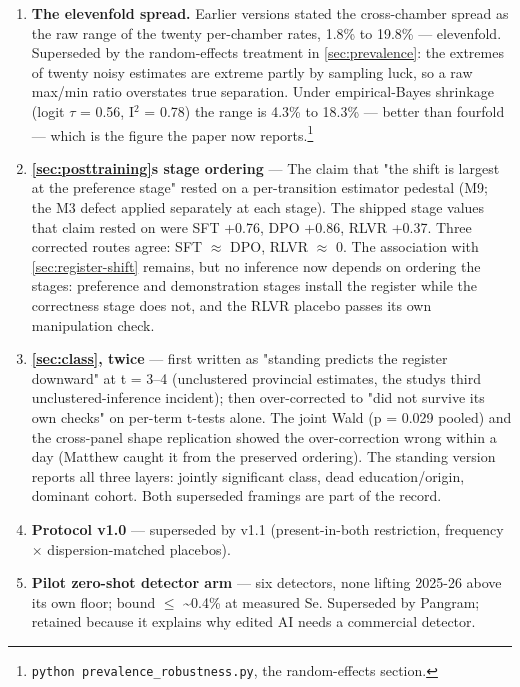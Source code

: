 \begin{enumerate}
\def\labelenumi{\arabic{enumi}.}
\item
  \textbf{The elevenfold spread.} Earlier versions stated the cross-chamber
  spread as the raw range of the twenty per-chamber rates, 1.8\% to 19.8\% ---
  elevenfold. Superseded by the random-effects treatment in \cref{sec:prevalence}: the
  extremes of twenty noisy estimates are extreme partly by sampling luck, so
  a raw max/min ratio overstates true separation. Under empirical-Bayes
  shrinkage (logit \(\tau\) = 0.56, I\({}^{2}\) = 0.78) the range is 4.3\% to 18.3\% ---
  better than fourfold --- which is the figure the paper now
  reports.\footnote{\texttt{python\ prevalence\_\allowbreak{}robustness.\allowbreak{}py}, the random-effects section.}
\item
  \textbf{\cref{sec:posttraining}\textquotesingle s stage ordering} --- The claim that "the shift is largest at the
  preference stage" rested on a per-transition estimator pedestal (M9; the
  M3 defect applied separately at each stage). The shipped stage values that
  claim rested on were SFT +0.76, DPO +0.86, RLVR +0.37. Three corrected
  routes agree:
  SFT \(\approx\) DPO, RLVR \(\approx\) 0. The association with \cref{sec:register-shift} remains, but no inference
  now depends on ordering the stages: preference and demonstration stages
  install the register while the correctness stage does not, and the RLVR
  placebo passes its own manipulation check.
\item
  \textbf{\cref{sec:class}, twice} --- first written as "standing predicts the register
  downward" at t = 3--4 (unclustered provincial estimates, the study\textquotesingle s third
  unclustered-inference incident); then over-corrected to "did not survive
  its own checks" on per-term t-tests alone. The joint Wald (p = 0.029
  pooled) and the cross-panel shape replication showed the over-correction
  wrong within a day (Matthew caught it from the preserved ordering). The
  standing version reports all three layers: jointly significant class,
  dead education/origin, dominant cohort. Both superseded framings are part
  of the record.
\item
  \textbf{Protocol v1.0} --- superseded by v1.1 (present-in-both restriction,
  frequency \(\times\) dispersion-matched placebos).
\item
  \textbf{Pilot zero-shot detector arm} --- six detectors, none lifting 2025-26
  above its own floor; bound \(\leq\) \textasciitilde0.4\% at measured Se. Superseded by Pangram;
  retained because it explains why edited AI needs a commercial detector.

\end{enumerate}
